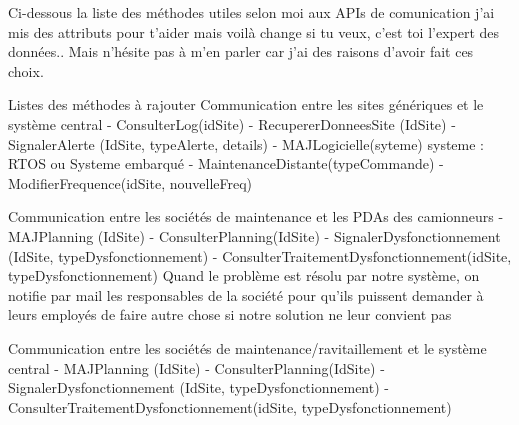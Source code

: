 Ci-dessous la liste des méthodes utiles selon moi aux APIs de comunication
j'ai mis des attributs pour t'aider mais voilà change si tu veux, c'est toi l'expert des données..
Mais n'hésite pas à m'en parler car j'ai des raisons d'avoir fait ces choix.

Listes des méthodes à rajouter
Communication entre les sites génériques et le système central
    - ConsulterLog(idSite)
    - RecupererDonneesSite (IdSite)
    - SignalerAlerte (IdSite, typeAlerte, details)
    - MAJLogicielle(syteme)
             systeme : RTOS ou Systeme embarqué
    - MaintenanceDistante(typeCommande)
    - ModifierFrequence(idSite, nouvelleFreq)

Communication entre les sociétés de maintenance et les PDAs des camionneurs
    - MAJPlanning (IdSite)
    - ConsulterPlanning(IdSite)
    - SignalerDysfonctionnement (IdSite, typeDysfonctionnement)
    - ConsulterTraitementDysfonctionnement(idSite, typeDysfonctionnement)
            Quand le problème est résolu par notre système, on notifie par mail les responsables
            de la société pour qu'ils puissent demander à leurs employés de faire autre chose 
            si notre solution ne leur convient pas

Communication entre les sociétés de maintenance/ravitaillement et le système central
    - MAJPlanning (IdSite)
    - ConsulterPlanning(IdSite)
    - SignalerDysfonctionnement (IdSite, typeDysfonctionnement)
    - ConsulterTraitementDysfonctionnement(idSite, typeDysfonctionnement)

